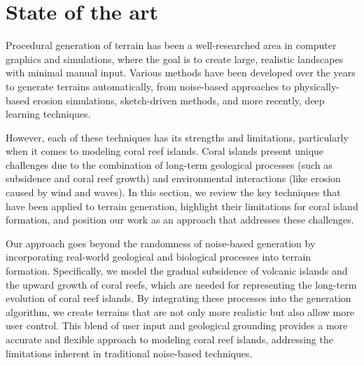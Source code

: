 \section{State of the art}
\label{sec:coral-island_SotA}
Procedural generation of terrain has been a well-researched area in computer graphics and simulations, where the goal is to create large, realistic landscapes with minimal manual input. Various methods have been developed over the years to generate terrains automatically, from noise-based approaches to physically-based erosion simulations, sketch-driven methods, and more recently, deep learning techniques.

However, each of these techniques has its strengths and limitations, particularly when it comes to modeling coral reef islands. Coral islands present unique challenges due to the combination of long-term geological processes (such as subsidence and coral reef growth) and environmental interactions (like erosion caused by wind and waves). In this section, we review the key techniques that have been applied to terrain generation, highlight their limitations for coral island formation, and position our work as an approach that addresses these challenges.


Our approach goes beyond the randomness of noise-based generation by incorporating real-world geological and biological processes into terrain formation. Specifically, we model the gradual subsidence of volcanic islands and the upward growth of coral reefs, which are needed for representing the long-term evolution of coral reef islands. By integrating these processes into the generation algorithm, we create terrains that are not only more realistic but also allow more user control. This blend of user input and geological grounding provides a more accurate and flexible approach to modeling coral reef islands, addressing the limitations inherent in traditional noise-based techniques.


